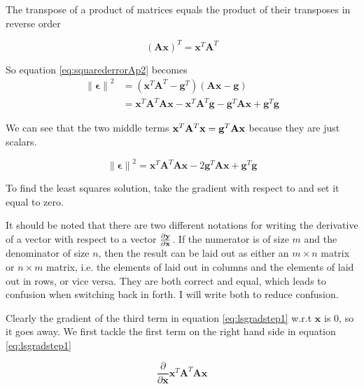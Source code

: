 \noindent The transpose of a product of matrices equals the product of their transposes in reverse order

\begin{equation}
	 ( \mathbf{Ax} )^{T} = \mathbf{x}^{T} \mathbf{A}^{T} 
\end{equation}

\noindent So equation \ref{eq:squarederrorAp2} becomes
\begin{equation}
	\begin{split}
		\mathbf{ \lVert \mathbf{\epsilon} \rVert }^2 & = ( \mathbf{x}^{T} \mathbf{A}^{T}  - \mathbf{g}^{T} )  ( \mathbf{Ax-g} ) \\
		& = \mathbf{x}^T \mathbf{A}^T \mathbf{A} \mathbf{x} - \mathbf{x}^T \mathbf{A}^T \mathbf{g} - \mathbf{g}^T \mathbf{A} \mathbf{x} + \mathbf{g}^T \mathbf{g}
	\end{split}
\end{equation}

\noindent We can see that the two middle terms $\mathbf{x}^T\mathbf{A}^T\mathbf{x} = \mathbf{g}^T \mathbf{Ax}$ because they are just scalars.

\begin{equation}\label{eq:lsgradstep1}
	\mathbf{ \lVert \mathbf{\epsilon} \rVert }^2 =  \mathbf{x}^{T} \mathbf{A}^{T} \mathbf{A} \mathbf{x} - 2 \mathbf{g}^{T} \mathbf{A} \mathbf{x} +   \mathbf{g}^T \mathbf{g}  
\end{equation}	

To find the least squares solution, take the gradient with respect to  and set it equal to zero. 

It should be noted that there are two different notations for writing the derivative of a vector with respect to a vector $\frac{ \partial{ \mathbf{y} } } { \partial{ \mathbf{x} } }$. If the numerator  is of size $m$ and the denominator  of size $n$, then the result can be laid out as either an $m \times n$ matrix or $n \times m$ matrix, i.e. the elements of  laid out in columns and the elements of  laid out in rows, or vice versa. They are both correct and equal, which leads to confusion when switching back in forth. I will write both to reduce confusion.

Clearly the gradient of the third term in equation \ref{eq:lsgradstep1} w.r.t $\mathbf{x}$ is $0$, so it goes away. We first tackle the first term on the right hand side in equation \ref{eq:lsgradstep1}

\begin{equation}
	\dfrac {\partial } {\partial \mathbf{x} }  \mathbf{x}^{T} \mathbf{A}^{T} \mathbf{A} \mathbf{x} 
\end{equation}

